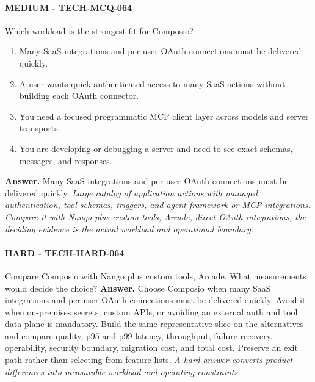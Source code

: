 \paragraph{MEDIUM - TECH-MCQ-064} Which workload is the strongest fit for Composio?
\begin{enumerate}[label=\Alph*.]
\item Many SaaS integrations and per-user OAuth connections must be delivered quickly.
\item A user wants quick authenticated access to many SaaS actions without building each OAuth connector.
\item You need a focused programmatic MCP client layer across models and server transports.
\item You are developing or debugging a server and need to see exact schemas, messages, and responses.
\end{enumerate}
\textbf{Answer.} Many SaaS integrations and per-user OAuth connections must be delivered quickly.
\textit{Large catalog of application actions with managed authentication, tool schemas, triggers, and agent-framework or MCP integrations. Compare it with Nango plus custom tools, Arcade, direct OAuth integrations; the deciding evidence is the actual workload and operational boundary.}
\paragraph{HARD - TECH-HARD-064} Compare Composio with Nango plus custom tools, Arcade. What measurements would decide the choice?
\textbf{Answer.} Choose Composio when many SaaS integrations and per-user OAuth connections must be delivered quickly. Avoid it when on-premises secrets, custom APIs, or avoiding an external auth and tool data plane is mandatory. Build the same representative slice on the alternatives and compare quality, p95 and p99 latency, throughput, failure recovery, operability, security boundary, migration cost, and total cost. Preserve an exit path rather than selecting from feature lists.
\textit{A hard answer converts product differences into measurable workload and operating constraints.}
